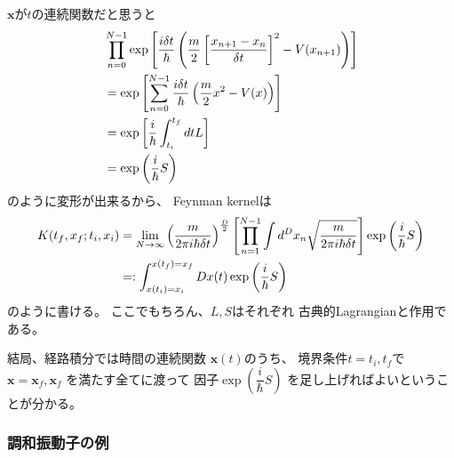 $\bm{x}$が$t$の連続関数だと思うと
\begin{align}
    &
    \prod_{n=0}^{N-1}
    \exp\left[
        \dfrac{ i \delta t }{\hbar}
        \left(
            \dfrac{m}{2}
            \left[
                \dfrac{
                    x_{n+1}
                -
                    x_{n}    
                }{\delta t}
            \right]^2
        -
            V( x_{n+1} )
        \right)
    \right]
\notag\\&=
    \exp\left[
        \sum_{n=0}^{N-1}
        \dfrac{ i \delta t }{\hbar}
        \left(
            \dfrac{m}{2}
            x^2
        -
            V( x )
        \right)
    \right]
\notag\\&=
    \exp\left[
        \dfrac{ i }{\hbar}
        \int_{t_i}^{t_f} dt
        L
    \right]
\notag\\&=
    \exp\left(\dfrac{i}{\hbar}S \right)
\end{align}
のように変形が出来るから、
Feynman kernelは
\begin{align}
    K( t_f, x_f ; t_i, x_i )
    &=
    \lim_{ N \to \infty }
    \left(
        \dfrac{m}{ 2 \pi i \hbar \delta t }
    \right)^{\frac{D}{2}}
    \left[
        \prod_{n=1}^{N-1}
        \int
        d^D x_n
        \sqrt{
            \dfrac{m}{2 \pi i \hbar \delta t}
        }
    \right]
    \exp\left(\dfrac{i}{\hbar}S \right)
\notag\\&
    =:
    \int_{x(t_i) = x_i}^{x(t_f) = x_f}
        Dx(t)
    \exp\left(\dfrac{i}{\hbar}S \right)
\end{align}
のように書ける。
ここでもちろん、$L, S$はそれぞれ
古典的Lagrangianと作用である。

結局、経路積分では時間の連続関数
$\bm{x}(t)$のうち、
境界条件$t = t_i, t_f$で
$\bm{x} = \bm{x}_f, \bm{x}_f$
を満たす全てに渡って
因子$\exp\left(\dfrac{i}{\hbar}S \right)$
を足し上げればよいということが分かる。

\subsubsection{調和振動子の例}

